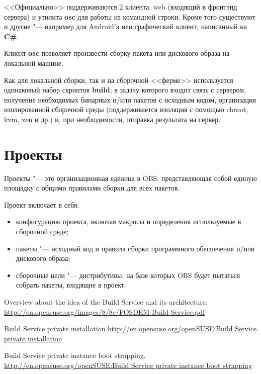\documentclass[10pt, a5paper]{article}
\begin{document}
<<Официально>> поддерживаются 2 клиента: web (входящий в фронтэнд сервера) и утилита \textbf{osc} для работы из командной строки. Кроме того существуют и другие "--- например для Android'а или графический клиент, написанный на \textbf{C\#}.

Клиент \textbf{osc} позволяет произвести сборку пакета или дискового образа на локальной машине.

Как для локальной сборки, так и на сборочной <<ферме>> используется одинаковый набор скриптов \textbf{build}, в задачу которого входит связь с сервером, получение необходимых бинарных и/или пакетов с исходным кодом, организация изолированной сборочной среды (поддерживается изоляция с помощью chroot, kvm, xen и др.) и, при необходимости, отправка результата на сервер.

\section*{Проекты}

Проекты "--- это организационная еденица в OBS, представляющая собой единую площадку с общими правилами сборки для всех пакетов.

Проект включает в себя:

\begin{itemize}
  \item конфигурацию проекта, включая макросы и определения используемые в сборочной среде;
  \item пакеты "--- исходный код и правила сборки программного обеспечения и/или дискового образа;
  \item сборочные цели "--- дистрибутивы, на базе которых OBS будет пытаться собрать пакеты,  входящие в проект.
\end{itemize}


\begin{thebibliography}{9}

 Overview about the idea of the Build Service and its architecture.
\url{http://en.opensuse.org/images/8/8e/FOSDEM Build Service.pdf}

 Build Service private installation \url{http://en.opensuse.org/openSUSE:Build Service private installation}

 Build Service private instance boot strapping.
\url{http://en.opensuse.org/openSUSE:Build Service private instance boot strapping}

\end{thebibliography}
\end{document}
